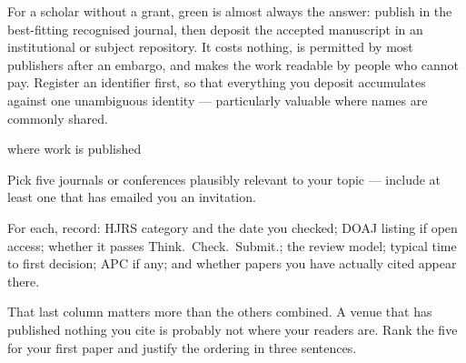 \begin{conceptbox}
For a scholar without a grant, green is almost always the answer: publish in
the best-fitting recognised journal, then deposit the accepted manuscript in an
institutional or subject repository. It costs nothing, is permitted by most
publishers after an embargo, and makes the work readable by people who cannot
pay. Register an  identifier first, so that everything you deposit
accumulates against one unambiguous identity --- particularly valuable where
names are commonly shared.
\end{conceptbox}

\begin{traditions}{where work is published}
\end{traditions}

\begin{lab}
Pick five journals or conferences plausibly relevant to your topic --- include
at least one that has emailed you an invitation.

\medskip
For each, record: HJRS category and the date you checked; DOAJ listing if open
access; whether it passes Think.\ Check.\ Submit.; the review model; typical
time to first decision; APC if any; and whether papers you have actually cited
appear there.

\medskip
That last column matters more than the others combined. A venue that has
published nothing you cite is probably not where your readers are. Rank the
five for your first paper and justify the ordering in three sentences.
\end{lab}


